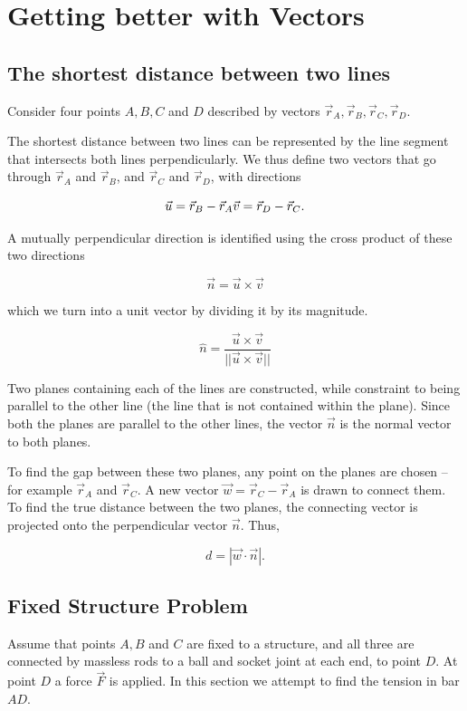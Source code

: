 \section{Getting better with Vectors}
\subsection{The shortest distance between two lines}
Consider four points $A, B, C$ and $D$ described by vectors $\vec{r}_A, \vec{r}_B, \vec{r}_C, \vec{r}_D$.

The shortest distance between two lines can be represented by the line segment that intersects both lines perpendicularly. We thus define two vectors that go through $\vec{r}_A$ and $\vec{r}_B$, and $\vec{r}_C$ and $\vec{r}_D$, with directions

$$
\vec{u} = \vec{r}_B - \vec{r}_A \\
\vec{v} = \vec{r}_D - \vec{r}_C.
$$

A mutually perpendicular direction is identified using the cross product of these two directions

$$
\vec{n} = \vec{u} \times \vec{v}
$$

which we turn into a unit vector by dividing it by its magnitude.

\begin{equation}
    \hat{n} = \frac{\vec{u} \times \vec{v}}{|| \vec{u} \times \vec{v} ||}
\end{equation}

Two planes containing each of the lines are constructed, while constraint to being parallel to the other line (the line that is not contained within the plane). Since both the planes are parallel to the other lines, the vector $\vec{n}$ is the normal vector to both planes.

To find the gap between these two planes, any point on the planes are chosen -- for example $\vec{r}_A$ and $\vec{r}_C$. A new vector $\vec{w} = \vec{r}_C - \vec{r}_A$ is drawn to connect them. To find the true distance between the two planes, the connecting vector is projected onto the perpendicular vector $\vec{n}$. Thus,

\begin{equation}
    d = |\vec{w} \cdot \vec{n}|.
\end{equation}

\subsection{Fixed Structure Problem}
Assume that points $A, B$ and $C$ are fixed to a structure, and all three are connected by massless rods to a ball and socket joint at each end, to point $D$. At point $D$ a force $\vec{F}$ is applied. In this section we attempt to find the tension in bar $AD$.

